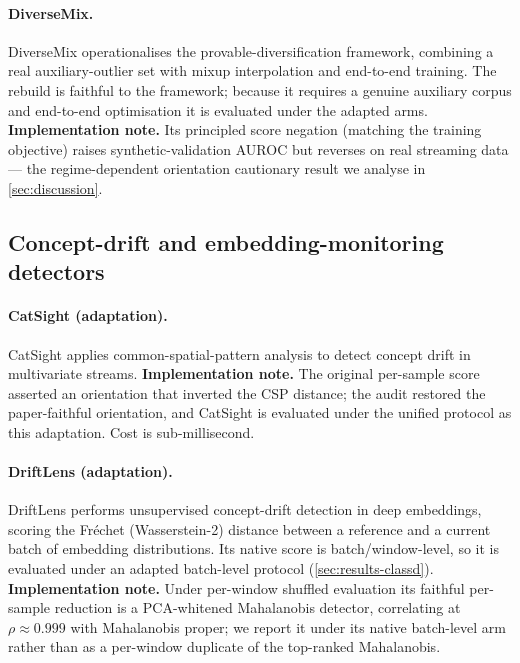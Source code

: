 \documentclass[11pt]{article}
\begin{document}
\paragraph{DiverseMix.}
DiverseMix \citep{Diversification2024} operationalises the provable-diversification
framework, combining a real auxiliary-outlier set with mixup interpolation and
end-to-end training. The rebuild is faithful to the framework; because it requires a
genuine auxiliary corpus and end-to-end optimisation it is evaluated under the adapted
arms. \textbf{Implementation note.} Its principled score negation (matching the
training objective) raises synthetic-validation AUROC but reverses on real streaming
data --- the regime-dependent orientation cautionary result we analyse in
\cref{sec:discussion}.

\subsection{Concept-drift and embedding-monitoring detectors}\label{sec:m-drift}

\paragraph{CatSight (adaptation).}
CatSight \citep{CatSight2023} applies common-spatial-pattern analysis to detect
concept drift in multivariate streams. \textbf{Implementation note.} The original
per-sample score asserted an orientation that inverted the CSP distance; the audit
restored the paper-faithful orientation, and CatSight is evaluated under the unified
protocol as this adaptation. Cost is sub-millisecond.

\paragraph{DriftLens (adaptation).}
DriftLens \citep{Greco2025} performs unsupervised concept-drift detection in deep
embeddings, scoring the Fr\'echet (Wasserstein-2) distance between a reference and a
current batch of embedding distributions. Its native score is batch/window-level, so
it is evaluated under an adapted batch-level protocol (\cref{sec:results-classd}).
\textbf{Implementation note.} Under per-window shuffled evaluation its faithful
per-sample reduction is a PCA-whitened Mahalanobis detector, correlating at
$\rho \approx 0.999$ with Mahalanobis proper; we report it under its native
batch-level arm rather than as a per-window duplicate of the top-ranked Mahalanobis.
\end{document}
